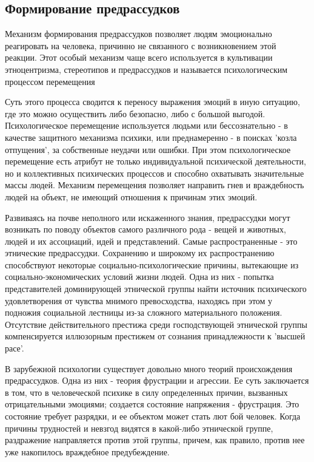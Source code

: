 \documentclass[14pt, a4paper] {ncc}
\begin{document}
    \subsection{Формирование предрассудков}
Механизм формирования предрассудков позволяет людям эмоционально реагировать
на человека, причинно не связанного с возникновением этой реакции. Этот особый
механизм чаще всего используется в культивации этноцентризма, стереотипов и
предрассудков и называется психологическим процессом перемещения

Суть этого процесса сводится к переносу выражения эмоций в иную ситуацию, где
это можно осуществить либо безопасно, либо с большой выгодой. Психологическое
перемещение используется людьми или бессознательно - в качестве защитного
механизма психики, или преднамеренно - в поисках 'козла отпущения', за
собственные неудачи или ошибки. При этом психологическое перемещение есть
атрибут не только индивидуальной психической деятельности, но и коллективных
психических процессов и способно охватывать значительные массы людей. Механизм
перемещения позволяет направить гнев и враждебность людей на объект, не имеющий
отношения к причинам этих эмоций.

Развиваясь на почве неполного или искаженного знания, предрассудки могут
возникать по поводу объектов самого различного рода - вещей и животных, людей
и их ассоциаций, идей и представлений. Самые распространенные - это этнические
предрассудки. Сохранению и широкому их распространению способствуют некоторые
социально-психологические причины, вытекающие из социально-экономических
условий жизни людей. Одна из них - попытка представителей доминирующей
этнической группы найти источник психического удовлетворения от чувства
мнимого превосходства, находясь при этом у подножия социальной лестницы из-за
сложного материального положения. Отсутствие действительного престижа среди
господствующей этнической группы компенсируется иллюзорным престижем от
сознания принадлежности к 'высшей расе'.

В зарубежной психологии существует довольно много теорий происхождения
предрассудков. Одна из них - теория фрустрации и агрессии. Ее суть заключается
в том, что в человеческой психике в силу определенных причин, вызванных
отрицательными эмоциями; создается состояние напряжения - фрустрация. Это
состояние требует разрядки, и ее объектом может стать лют бой человек. Когда
причины трудностей и невзгод видятся в какой-либо этнической группе, раздражение
направляется против этой группы, причем, как правило, против нее уже накопилось
враждебное предубеждение.
\end{document}
